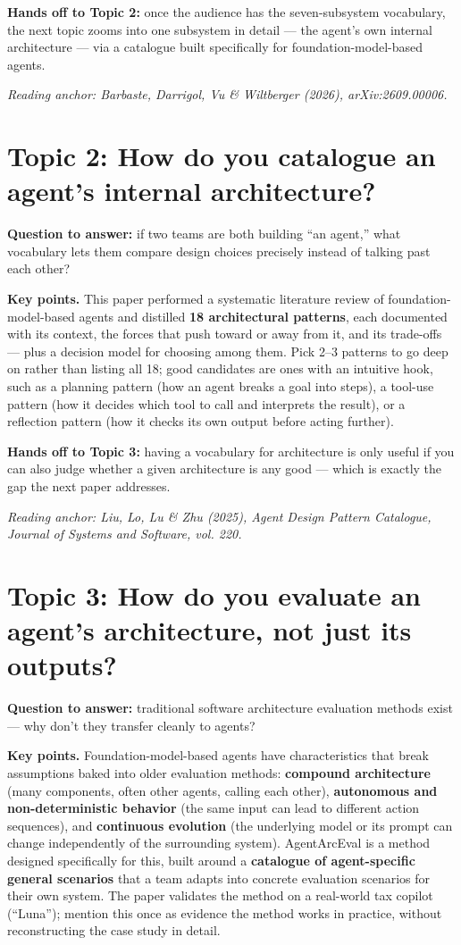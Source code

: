 \documentclass[12pt,a4paper]{article}
\newcommand{\source}[1]{\par\textcolor{teal!70!black}{\textit{Reading anchor: #1}}\par}
\begin{document}
\textbf{Hands off to Topic 2:} once the audience has the seven-subsystem vocabulary, the next topic zooms into one subsystem in detail --- the agent's own internal architecture --- via a catalogue built specifically for foundation-model-based agents.

\source{Barbaste, Darrigol, Vu \& Wiltberger (2026), arXiv:2609.00006.}

\section{Topic 2: How do you catalogue an agent's internal architecture?}
\textbf{Question to answer:} if two teams are both building ``an agent,'' what vocabulary lets them compare design choices precisely instead of talking past each other?

\textbf{Key points.} This paper performed a systematic literature review of foundation-model-based agents and distilled \textbf{18 architectural patterns}, each documented with its context, the forces that push toward or away from it, and its trade-offs --- plus a decision model for choosing among them. Pick 2--3 patterns to go deep on rather than listing all 18; good candidates are ones with an intuitive hook, such as a planning pattern (how an agent breaks a goal into steps), a tool-use pattern (how it decides which tool to call and interprets the result), or a reflection pattern (how it checks its own output before acting further).

\textbf{Hands off to Topic 3:} having a vocabulary for architecture is only useful if you can also judge whether a given architecture is any good --- which is exactly the gap the next paper addresses.

\source{Liu, Lo, Lu \& Zhu (2025), \emph{Agent Design Pattern Catalogue}, Journal of Systems and Software, vol. 220.}

\section{Topic 3: How do you evaluate an agent's architecture, not just its outputs?}
\textbf{Question to answer:} traditional software architecture evaluation methods exist --- why don't they transfer cleanly to agents?

\textbf{Key points.} Foundation-model-based agents have characteristics that break assumptions baked into older evaluation methods: \textbf{compound architecture} (many components, often other agents, calling each other), \textbf{autonomous and non-deterministic behavior} (the same input can lead to different action sequences), and \textbf{continuous evolution} (the underlying model or its prompt can change independently of the surrounding system). AgentArcEval is a method designed specifically for this, built around a \textbf{catalogue of agent-specific general scenarios} that a team adapts into concrete evaluation scenarios for their own system. The paper validates the method on a real-world tax copilot (``Luna''); mention this once as evidence the method works in practice, without reconstructing the case study in detail.
\end{document}
